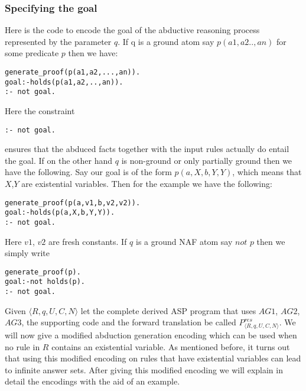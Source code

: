 \subsubsection{Specifying the goal}
Here is the code to encode the goal of the abductive reasoning process represented by the parameter $q$. If q is a ground atom say $p(a1,a2..,an)$ for some predicate $p$ then we
have:
\begin{lstlisting}[frame=none]
generate_proof(p(a1,a2,...,an)).
goal:-holds(p(a1,a2,..,an)).
:- not goal.
\end{lstlisting} 
Here the constraint \begin{lstlisting}[frame=none]
:- not goal. \end{lstlisting}
ensures that the abduced facts together with the input rules actually do entail the goal.
If on the other hand $q$ is non-ground or only partially ground then we have the following. Say our goal is of the form $p(a,X,b,Y,Y)$, which means that $X$,$Y$ are existential variables. Then for the example we have the following:
\begin{lstlisting}[frame=none]
generate_proof(p(a,v1,b,v2,v2)).
goal:-holds(p(a,X,b,Y,Y)).
:- not goal.
\end{lstlisting}
Here $v1$, $v2$ are fresh constants. If $q$ is a ground NAF atom say $\textit{not p}$ then we simply write 
\begin{lstlisting}[frame=none]
generate_proof(p).
goal:-not holds(p).
:- not goal.
\end{lstlisting}
Given $\langle R,q,U,C,N \rangle$ let the complete derived ASP program that uses $AG1$, $AG2$, $AG3$, the supporting code and the forward translation be called $P^{res}_{\langle R,q,U,C,N\rangle}$. We will now give a modified abduction generation encoding which can be used when no rule in $R$ contains an existential variable. As mentioned before, it turns out that using this modified encoding on rules that have existential variables can lead to infinite answer sets. After giving this modified encoding we will explain in detail the encodings with the aid of an example. 

